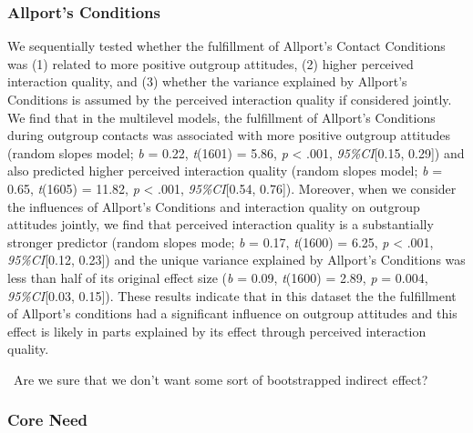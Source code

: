 \subsubsection{Allport's Conditions}

We sequentially tested whether the fulfillment of Allport's Contact
Conditions was (1) related to more positive outgroup attitudes, (2)
higher perceived interaction quality, and (3) whether the variance
explained by Allport's Conditions is assumed by the perceived
interaction quality if considered jointly. We find that in the
multilevel models, the fulfillment of Allport's Conditions during
outgroup contacts was associated with more positive outgroup attitudes
(random slopes model; \textit{b} = 0.22, \textit{t}(1601) = 5.86,
\textit{p} \textless{} .001, \textit{95\%CI}{[}0.15, 0.29{]}) and also
predicted higher perceived interaction quality (random slopes model;
\textit{b} = 0.65, \textit{t}(1605) = 11.82, \textit{p} \textless{}
.001, \textit{95\%CI}{[}0.54, 0.76{]}). Moreover, when we consider the
influences of Allport's Conditions and interaction quality on outgroup
attitudes jointly, we find that perceived interaction quality is a
substantially stronger predictor (random slopes mode; \textit{b} = 0.17,
\textit{t}(1600) = 6.25, \textit{p} \textless{} .001,
\textit{95\%CI}{[}0.12, 0.23{]}) and the unique variance explained by
Allport's Conditions was less than half of its original effect size
(\textit{b} = 0.09, \textit{t}(1600) = 2.89, \textit{p} = 0.004,
\textit{95\%CI}{[}0.03, 0.15{]}). These results indicate that in this
dataset the the fulfillment of Allport's conditions had a significant
influence on outgroup attitudes and this effect is likely in parts
explained by its effect through perceived interaction quality.

\faQuestionCircle~Are we sure that we don't want some sort of
bootstrapped indirect effect?

\subsubsection{Core Need}

